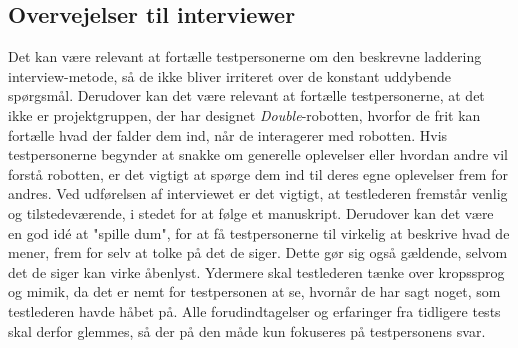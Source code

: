 \subsection{Overvejelser til interviewer}
\label{ParametreOvervejelserTestleder}
%
Det kan være relevant at fortælle testpersonerne om den beskrevne laddering interview-metode, så de ikke bliver irriteret over de konstant uddybende spørgsmål. Derudover kan det være relevant at fortælle testpersonerne, at det ikke er projektgruppen, der har designet \textit{Double}-robotten, hvorfor de frit kan fortælle hvad der falder dem ind, når de interagerer med robotten. Hvis testpersonerne begynder at snakke om generelle oplevelser eller hvordan andre vil forstå robotten, er det vigtigt at spørge dem ind til deres egne oplevelser frem for andres. \blankline
%
Ved udførelsen af interviewet er det vigtigt, at testlederen fremstår venlig og tilstedeværende, i stedet for at følge et manuskript. Derudover kan det være en god idé at "spille dum", for at få testpersonerne til virkelig at beskrive hvad de mener, frem for selv at tolke på det de siger. Dette gør sig også gældende, selvom det de siger kan virke åbenlyst. Ydermere skal testlederen tænke over kropssprog og mimik, da det er nemt for testpersonen at se, hvornår de har sagt noget, som testlederen havde håbet på. Alle forudindtagelser og erfaringer fra tidligere tests skal derfor glemmes, så der på den måde kun fokuseres på testpersonens svar. 

